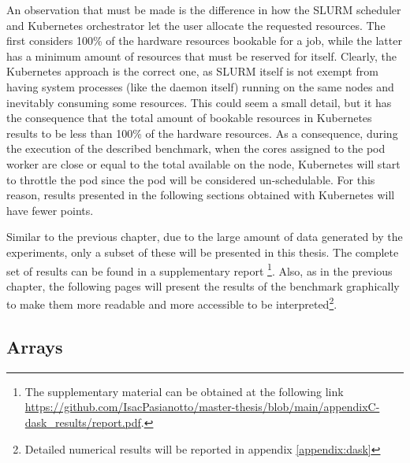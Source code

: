 An observation that must be made is the difference in how the SLURM scheduler
and Kubernetes orchestrator let the user allocate the requested resources.
The first considers 100\% of the hardware resources bookable for a job, while
the latter has a minimum amount of resources that must be reserved for itself.
Clearly, the Kubernetes approach is the correct one, as SLURM itself is not
exempt from having system processes (like the daemon itself) running on the same
nodes and inevitably consuming some resources.
This could seem a small detail, but it has the consequence that the total amount
of bookable resources in Kubernetes results to be less than 100\% of the
hardware resources.
As a consequence, during the execution of the described benchmark, when the
cores assigned to the pod worker are close or equal to the total available on
the node, Kubernetes will start to throttle the pod since the pod will be
considered un-schedulable.
For this reason, results presented in the following sections obtained with
Kubernetes will have fewer points.

Similar to the previous chapter, due to the large amount of data generated by
the experiments, only a subset of these will be presented in this thesis.
The complete set of results can be found in a supplementary report \footnote {
  The supplementary material can be obtained at the following link
  \url{https://github.com/IsacPasianotto/master-thesis/blob/main/appendixC-dask_results/report.pdf}.}.
Also, as in the previous chapter, the following pages will present the results
of the benchmark graphically to make them more readable and more accessible to
be interpreted\footnote{Detailed numerical results will be reported in appendix
\ref{appendix:dask}}.

\subsection{Arrays}



